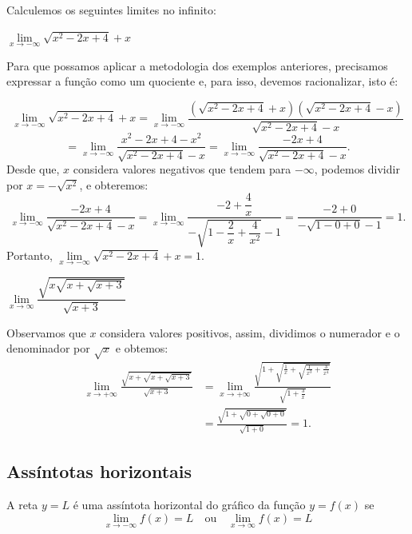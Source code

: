 \cleardoublepage\documentclass[../main.tex]{subfiles}
\begin{document}
  \begin{exeresol}
    Calculemos os seguintes limites no infinito:\\
     \begin{compactenum}[a)]
     \item \(\lim\limits_{x \to -\infty}\sqrt{x^2-2x+4}+x\)\\
  \begin{resol}
  Para que possamos aplicar a metodologia dos exemplos anteriores, precisamos expressar a função como um quociente e, para isso, devemos racionalizar, isto é:

\[ \lim\limits_{x \to -\infty}\sqrt{x^2-2x+4}+x = \lim\limits_{x \to -\infty}\dfrac{\left(\sqrt{x^2-2x+4}+x\right) \left(\sqrt{x^2-2x+4}-x\right)}{\sqrt{x^2-2x+4}-x} \] \[ =\lim\limits_{x \to -\infty}\dfrac{x^2-2x+4-x^2}{\sqrt{x^2-2x+4}-x} =\lim\limits_{x \to -\infty}\dfrac{-2x+4}{\sqrt{x^2-2x+4}-x}. \]
Desde que, \(x\) considera valores negativos que tendem para \(-\infty\), podemos dividir por \(x=-\sqrt{x^2}\), e obteremos:
\[ \lim\limits_{x \to -\infty}\dfrac{-2x+4}{\sqrt{x^2-2x+4}-x}= \lim\limits_{x \to -\infty}\dfrac{-2+\dfrac{4}{x}}{-\sqrt{1-\dfrac{2}{x}+\dfrac{4}{x^2}}-1}=\dfrac{-2+0}{-\sqrt{1-0+0}-1}=1. \]
Portanto, \(\lim\limits_{x \to -\infty}\sqrt{x^2-2x+4}+x=1\).
  \end{resol}
  \item \(\lim\limits_{x \to \infty}\dfrac{\sqrt{x\sqrt{x+\sqrt{x+3}}}}{\sqrt{x+3}}\)\\
  \begin{resol}
  Observamos que \(x\) considera valores positivos, assim, dividimos o numerador e o denominador por \(\sqrt{x}\) e obtemos:
  \begin{align*}
      \lim\limits_{x \to +\infty}\frac{\sqrt{x+\sqrt{x+\sqrt{x+3}}}}{\sqrt{x+3}}&= \lim\limits_{x \to +\infty}\frac{\sqrt{1+\sqrt{\frac{1}{x}+\sqrt{\frac{1}{x^3}+\frac{3}{x^4}}}}}{\sqrt{1+\frac{3}{x}}}\\ &=\frac{\sqrt{1+\sqrt{0+\sqrt{0+0}}}}{\sqrt{1+0}}=1. 
  \end{align*}
  \end{resol}
     \end{compactenum}
  \end{exeresol}
  
  
\subsection{Assíntotas horizontais}\hypertarget{AssintHoriz}{}
A reta $y = L$ é uma assíntota horizontal do gráfico da função $y = f(x)$ se
\begin{equation*}
  \lim_{x\to -\infty} f(x) = L\quad\text{ou}\quad\lim_{x\to\infty} f(x) = L
\end{equation*}
\end{document}
